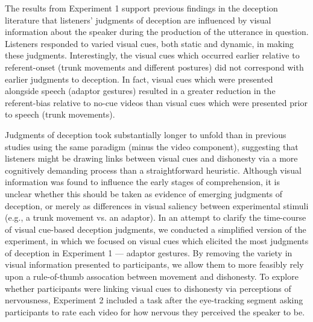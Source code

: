 \documentclass[a4paper,man,natbib]{apa6}
\begin{document}
The results from Experiment 1 support previous findings in the deception literature that listeners' judgments of deception are influenced by visual information about the speaker during the production of the utterance in question. %
Listeners responded to varied visual cues, both static and dynamic, in making these judgments.
Interestingly, the visual cues which occurred earlier relative to referent-onset (trunk movements and different postures) did not correspond with earlier judgments to deception.
In fact, visual cues which were presented alongside speech (adaptor gestures) resulted in a greater reduction in the referent-bias relative to no-cue videos than visual cues which were presented prior to speech (trunk movements).

Judgments of deception took substantially longer to unfold than in previous studies using the same paradigm (minus the video component), suggesting that listeners might be drawing links between visual cues and dishonesty via a more cognitively demanding process than a straightforward heuristic.
Although visual information was found to influence the early stages of comprehension, it is unclear whether this should be taken as evidence of emerging judgments of deception, or merely as differences in visual saliency between experimental stimuli (e.g., a trunk movement vs. an adaptor).
In an attempt to clarify the time-course of visual cue-based deception judgments, we conducted a simplified version of the experiment, in which we focused on visual cues which elicited the most judgments of deception in Experiment 1 --- adaptor gestures.
By removing the variety in visual information presented to participants, we allow them to more feasibly rely upon a rule-of-thumb assocation between movement and dishonesty. %
To explore whether participants were linking visual cues to dishonesty via perceptions of nervousness, Experiment 2 included a task after the eye-tracking segment asking participants to rate each video for how nervous they perceived the speaker to be.
\end{document}
